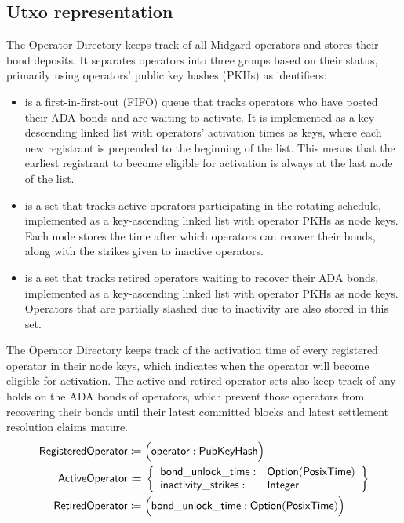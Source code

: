 \documentclass[../midgard.tex]{subfiles}
\begin{document}
\subsection{Utxo representation}
\label{h:operator-directory-utxo-representation}

The Operator Directory keeps track of all Midgard operators and stores their bond deposits.
It separates operators into three groups based on their status, primarily using operators' public key hashes (PKHs) as identifiers:
\begin{itemize}
    \item {} is a first-in-first-out (FIFO) queue that tracks operators who have posted their ADA bonds and are waiting to activate.
      It is implemented as a key-descending linked list with operators' activation times as keys, where each new registrant is prepended to the beginning of the list.
      This means that the earliest registrant to become eligible for activation is always at the last node of the list.
    \item {} is a set that tracks active operators participating in the rotating schedule, implemented as a key-ascending linked list with operator PKHs as node keys.
      Each node stores the time after which operators can recover their bonds, along with the strikes given to inactive operators.
    \item {} is a set that tracks retired operators waiting to recover their ADA bonds, implemented as a key-ascending linked list with operator PKHs as node keys.
      Operators that are partially slashed due to inactivity are also stored in this set.
\end{itemize}

The Operator Directory keeps track of the activation time of every registered operator in their node keys, which indicates when the operator will become eligible for activation.
The active and retired operator sets also keep track of any holds on the ADA bonds of operators, which prevent those operators from recovering their bonds until their latest committed blocks and latest settlement resolution claims mature.
\begin{align*}
    \mathsf{RegisteredOperator}    &\coloneq \Bigl( \mathsf{operator}:
        \mathsf{PubKeyHash} \Bigr) \\
    \mathsf{ActiveOperator}     &\coloneq{} \left\{
      \begin{array}{ll}
        \mathsf{bond\_unlock\_time} : & \mathsf{Option}(\mathsf{PosixTime}) \\
        \mathsf{inactivity\_strikes} : & \mathsf{Integer}
      \end{array} \right\} \\
    \mathsf{RetiredOperator}    &\coloneq \Bigl( \mathsf{bond\_unlock\_time}:
        \mathsf{Option}(\mathsf{PosixTime}) \Bigr)
\end{align*}
\end{document}
